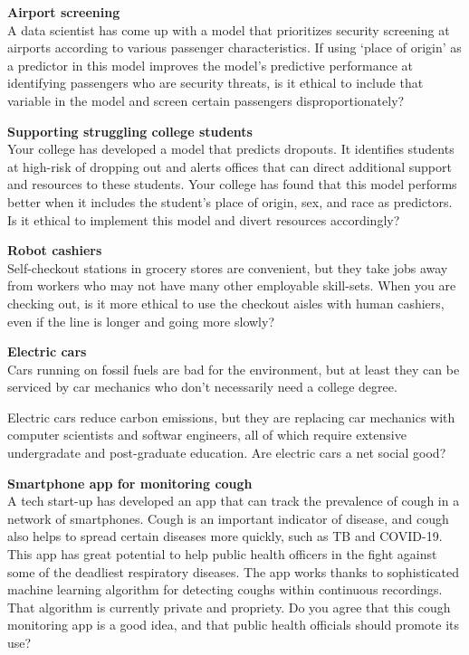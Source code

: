 \documentclass[
]{book}
\begin{document}
\textbf{Airport screening}\\
A data scientist has come up with a model that prioritizes security screening at airports according to various passenger characteristics. If using `place of origin' as a predictor in this model improves the model's predictive performance at identifying passengers who are security threats, is it ethical to include that variable in the model and screen certain passengers disproportionately?

\textbf{Supporting struggling college students}\\
Your college has developed a model that predicts dropouts. It identifies students at high-risk of dropping out and alerts offices that can direct additional support and resources to these students. Your college has found that this model performs better when it includes the student's place of origin, sex, and race as predictors. Is it ethical to implement this model and divert resources accordingly?

\textbf{Robot cashiers}\\
Self-checkout stations in grocery stores are convenient, but they take jobs away from workers who may not have many other employable skill-sets. When you are checking out, is it more ethical to use the checkout aisles with human cashiers, even if the line is longer and going more slowly?

\textbf{Electric cars}\\
Cars running on fossil fuels are bad for the environment, but at least they can be serviced by car mechanics who don't necessarily need a college degree.

Electric cars reduce carbon emissions, but they are replacing car mechanics with computer scientists and softwar engineers, all of which require extensive undergradate and post-graduate education. Are electric cars a net social good?

\textbf{Smartphone app for monitoring cough}\\
A tech start-up has developed an app that can track the prevalence of cough in a network of smartphones. Cough is an important indicator of disease, and cough also helps to spread certain diseases more quickly, such as TB and COVID-19. This app has great potential to help public health officers in the fight against some of the deadliest respiratory diseases. The app works thanks to sophisticated machine learning algorithm for detecting coughs within continuous recordings. That algorithm is currently private and propriety. Do you agree that this cough monitoring app is a good idea, and that public health officials should promote its use?
\end{document}
